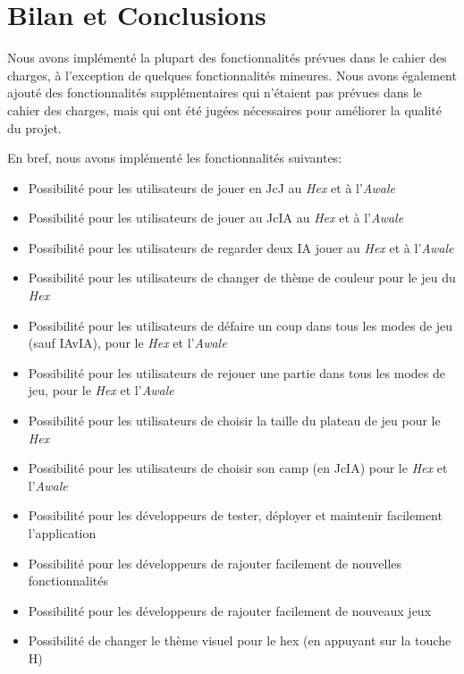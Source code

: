 \section{Bilan et Conclusions}

Nous avons implémenté la plupart des fonctionnalités prévues dans le cahier des charges, à l'exception de quelques
fonctionnalités mineures. Nous avons également ajouté des fonctionnalités supplémentaires qui n'étaient pas prévues
dans le cahier des charges, mais qui ont été jugées nécessaires pour améliorer la qualité du projet.

En bref, nous avons implémenté les fonctionnalités suivantes:

\begin{itemize}
    \item Possibilité pour les utilisateurs de jouer en JcJ au \emph{Hex} et à l'\emph{Awale}
    \item Possibilité pour les utilisateurs de jouer au JcIA au \emph{Hex} et à l'\emph{Awale}
    \item Possibilité pour les utilisateurs de regarder deux IA jouer au \emph{Hex} et à l'\emph{Awale}
    \item Possibilité pour les utilisateurs de changer de thème de couleur pour le jeu du \emph{Hex}
    \item Possibilité pour les utilisateurs de défaire un coup dans tous les modes de jeu (sauf IAvIA), pour le \emph{Hex} et l'\emph{Awale}
    \item Possibilité pour les utilisateurs de rejouer une partie dans tous les modes de jeu, pour le \emph{Hex} et l'\emph{Awale}
    \item Possibilité pour les utilisateurs de choisir la taille du plateau de jeu pour le \emph{Hex}
    \item Possibilité pour les utilisateurs de choisir son camp (en JcIA) pour le \emph{Hex} et l'\emph{Awale}
    \item Possibilité pour les développeurs de tester, déployer et maintenir facilement l'application
    \item Possibilité pour les développeurs de rajouter facilement de nouvelles fonctionnalités
    \item Possibilité pour les développeurs de rajouter facilement de nouveaux jeux
    \item Possibilité de changer le thème visuel pour le hex (en appuyant sur la touche H)
\end{itemize}

